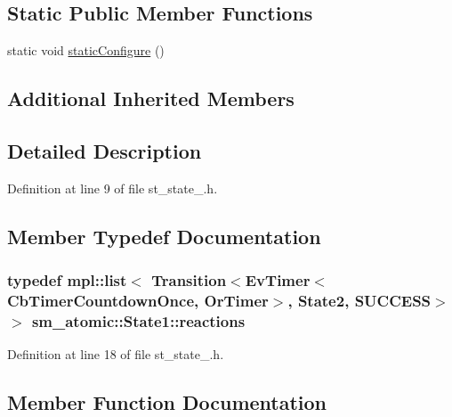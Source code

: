 \subsection*{Static Public Member Functions}
\begin{DoxyCompactItemize}
\item 
static void \hyperlink{structsm__atomic_1_1State1_a299adfad0ff1e2c592c319e1fa5de114}{static\+Configure} ()
\end{DoxyCompactItemize}
\subsection*{Additional Inherited Members}


\subsection{Detailed Description}


Definition at line 9 of file st\+\_\+state\+\_.\+h.



\subsection{Member Typedef Documentation}
\subsubsection[{\texorpdfstring{reactions}{reactions}}]{\setlength{\rightskip}{0pt plus 5cm}typedef mpl\+::list$<$ Transition$<${\bf Ev\+Timer}$<${\bf Cb\+Timer\+Countdown\+Once}, {\bf Or\+Timer}$>$, {\bf State2}, {\bf S\+U\+C\+C\+E\+SS}$>$ $>$ {\bf sm\+\_\+atomic\+::\+State1\+::reactions}}\hypertarget{structsm__atomic_1_1State1_ab05a524c2d0d99c2ca7c4174d49de73c}{}\label{structsm__atomic_1_1State1_ab05a524c2d0d99c2ca7c4174d49de73c}


Definition at line 18 of file st\+\_\+state\+\_.\+h.



\subsection{Member Function Documentation}
